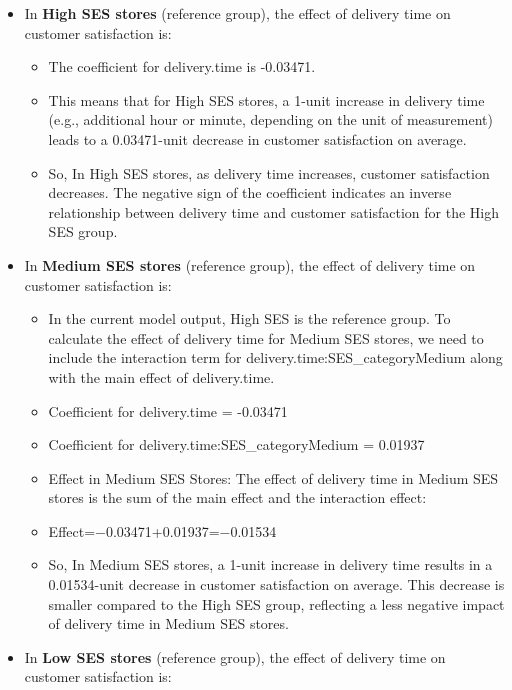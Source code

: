 \documentclass[
]{article}
\providecommand{\tightlist}{%
  \setlength{\itemsep}{0pt}\setlength{\parskip}{0pt}}
\begin{document}
\begin{itemize}
\tightlist
\item
  In \textbf{High SES stores} (reference group), the effect of delivery
  time on customer satisfaction is:

  \begin{itemize}
  \tightlist
  \item
    The coefficient for delivery.time is -0.03471.
  \item
    This means that for High SES stores, a 1-unit increase in delivery
    time (e.g., additional hour or minute, depending on the unit of
    measurement) leads to a 0.03471-unit decrease in customer
    satisfaction on average.
  \item
    So, In High SES stores, as delivery time increases, customer
    satisfaction decreases. The negative sign of the coefficient
    indicates an inverse relationship between delivery time and customer
    satisfaction for the High SES group.
  \end{itemize}
\item
  In \textbf{Medium SES stores} (reference group), the effect of
  delivery time on customer satisfaction is:

  \begin{itemize}
  \tightlist
  \item
    In the current model output, High SES is the reference group. To
    calculate the effect of delivery time for Medium SES stores, we need
    to include the interaction term for
    delivery.time:SES\_categoryMedium along with the main effect of
    delivery.time.
  \item
    Coefficient for delivery.time = -0.03471
  \item
    Coefficient for delivery.time:SES\_categoryMedium = 0.01937
  \item
    Effect in Medium SES Stores: The effect of delivery time in Medium
    SES stores is the sum of the main effect and the interaction effect:
  \item
    Effect=−0.03471+0.01937=−0.01534
  \item
    So, In Medium SES stores, a 1-unit increase in delivery time results
    in a 0.01534-unit decrease in customer satisfaction on average. This
    decrease is smaller compared to the High SES group, reflecting a
    less negative impact of delivery time in Medium SES stores.
  \end{itemize}
\item
  In \textbf{Low SES stores} (reference group), the effect of delivery
  time on customer satisfaction is:


\end{itemize}
\end{document}
